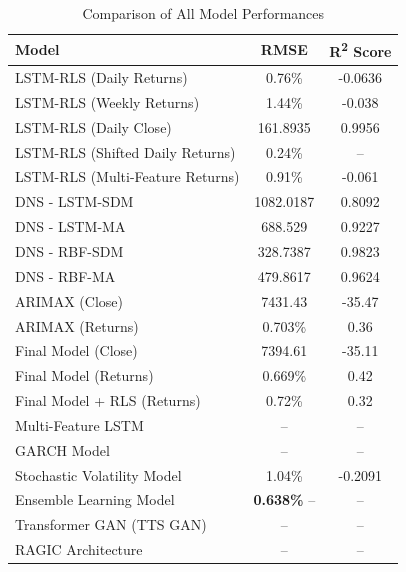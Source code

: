 \begin{table}[h!]
    \centering
    \caption{Comparison of All Model Performances}
    \label{tab:all_model_comparison}
    \begin{tabular}{|l|c|c|}
    \hline
    \textbf{Model} & \textbf{RMSE} & \textbf{R\textsuperscript{2} Score} \\ \hline
    
    LSTM-RLS (Daily Returns) & 0.76\% & -0.0636 \\ \hline
    LSTM-RLS (Weekly Returns) & 1.44\% & -0.038 \\ \hline
    LSTM-RLS (Daily Close) & 161.8935 & 0.9956 \\ \hline
    LSTM-RLS (Shifted Daily Returns) & 0.24\% & -- \\ \hline
    LSTM-RLS (Multi-Feature Returns) & 0.91\% & -0.061 \\ \hline
    
    DNS - LSTM-SDM & 1082.0187 & 0.8092 \\ \hline
    DNS - LSTM-MA & 688.529 & 0.9227 \\ \hline
    DNS - RBF-SDM & 328.7387 & 0.9823 \\ \hline
    DNS - RBF-MA & 479.8617 & 0.9624 \\ \hline
    
    ARIMAX (Close) & 7431.43 & -35.47 \\ \hline
    ARIMAX (Returns) & 0.703\% & 0.36 \\ \hline
    Final Model (Close) & 7394.61 & -35.11 \\ \hline
    Final Model (Returns) & 0.669\% & 0.42 \\ \hline
    Final Model + RLS (Returns) & 0.72\% & 0.32 \\ \hline
    
    Multi-Feature LSTM & -- & -- \\ \hline
    GARCH Model & -- & -- \\ \hline
    Stochastic Volatility Model & 1.04\% & -0.2091 \\ \hline
    Ensemble Learning Model & \textbf{0.638\%} -- & -- \\ \hline
    Transformer GAN (TTS GAN) & -- & -- \\ \hline
    RAGIC Architecture & -- & -- \\ \hline
    
    \end{tabular}
    \end{table}

